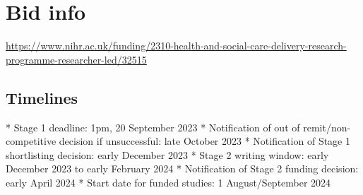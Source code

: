 \section{Bid info}

\url{https://www.nihr.ac.uk/funding/2310-health-and-social-care-delivery-research-programme-researcher-led/32515}

\subsection{Timelines}

\begin{markdown}
* Stage 1 deadline: 1pm, 20 September 2023
* Notification of out of remit/non-competitive decision if unsuccessful: late October 2023
* Notification of Stage 1 shortlisting decision: early December 2023
* Stage 2 writing window: early December 2023 to early February 2024
* Notification of Stage 2 funding decision: early April 2024
* Start date for funded studies: 1 August/September 2024
\end{markdown}